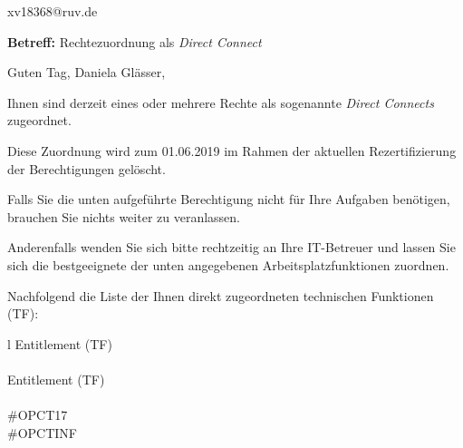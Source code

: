 \documentclass[a4paper,landscape,12pt]{letter}
\begin{document}
\begin{letter}{xv18368@ruv.de\hfill \break}
\begin{normalsize}
	\opening{\textbf{Betreff:} Rechtezuordnung als \emph{Direct Connect}}
	\begin{normalsize} \hfill
	\end{normalsize}

	\begin{normalsize}
		Guten Tag, 
	Daniela Glässer, \hfill \break
	\end{normalsize}
	\end{normalsize}
	
\begin{normalsize}
	Ihnen sind derzeit eines oder mehrere Rechte als sogenannte \emph{Direct Connects} zugeordnet.
	
	Diese Zuordnung wird zum 01.06.2019 im Rahmen der aktuellen Rezertifizierung der Berechtigungen gelöscht.
	
	Falls Sie die unten aufgeführte Berechtigung nicht für Ihre Aufgaben benötigen, 
	brauchen Sie nichts weiter zu veranlassen.
	
	Anderenfalls wenden Sie sich bitte rechtzeitig an Ihre IT-Betreuer 
	und lassen Sie sich die bestgeeignete der unten angegebenen Arbeitsplatzfunktionen zuordnen.
	\end{normalsize}
	
\begin{normalsize}
	Nachfolgend die Liste der Ihnen direkt zugeordneten technischen Funktionen (TF):

	\begin{longtable}{l}
		Entitlement (TF) \\ \hline
		\endfirsthead
		\\\hline
		Entitlement (TF) \\ \hline
		\endhead %
		\multicolumn{1}{r@{}}{Fortsetzung \ldots}\\
		\endfoot
		\hline
		\endlastfoot
	\#OPCT17\\\#OPCTINF\\
	\end{longtable}
	\end{normalsize}
	

\end{letter}
\end{document}
